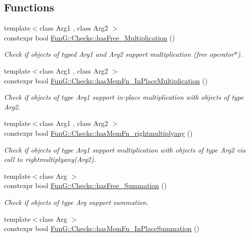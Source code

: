 \subsection*{Functions}
\begin{DoxyCompactItemize}
\item 
{\footnotesize template$<$class Arg1 , class Arg2 $>$ }\\constexpr bool \hyperlink{namespaceFunG_1_1Checks_a81302dfb773e50401ec899c3b9a53c4c}{Fun\+G\+::\+Checks\+::has\+Free\+\_\+\+Multiplication} ()
\begin{DoxyCompactList}\small\item\em Check if objects of typed Arg1 and Arg2 support multiplication (free operator$\ast$). \end{DoxyCompactList}\item 
{\footnotesize template$<$class Arg1 , class Arg2 $>$ }\\constexpr bool \hyperlink{namespaceFunG_1_1Checks_a1fb52331af88ccf29e380c8e5597e801}{Fun\+G\+::\+Checks\+::has\+Mem\+Fn\+\_\+\+In\+Place\+Multiplication} ()
\begin{DoxyCompactList}\small\item\em Check if objects of type Arg1 support in-\/place multiplication with objects of type Arg2. \end{DoxyCompactList}\item 
{\footnotesize template$<$class Arg1 , class Arg2 $>$ }\\constexpr bool \hyperlink{namespaceFunG_1_1Checks_a88d1f93f87cf5f51d426fcfee862d6f6}{Fun\+G\+::\+Checks\+::has\+Mem\+Fn\+\_\+rightmultiplyany} ()
\begin{DoxyCompactList}\small\item\em Check if objects of type Arg1 support multiplication with objects of type Arg2 via call to rightmultiplyany(\+Arg2). \end{DoxyCompactList}\item 
{\footnotesize template$<$class Arg $>$ }\\constexpr bool \hyperlink{namespaceFunG_1_1Checks_a8545906a81acf9f533c3342b0d02a6e9}{Fun\+G\+::\+Checks\+::has\+Free\+\_\+\+Summation} ()
\begin{DoxyCompactList}\small\item\em Check if objects of type Arg support summation. \end{DoxyCompactList}\item 
{\footnotesize template$<$class Arg $>$ }\\constexpr bool \hyperlink{namespaceFunG_1_1Checks_a5357edca3d0fdcfbc1fba5fd43713b40}{Fun\+G\+::\+Checks\+::has\+Mem\+Fn\+\_\+\+In\+Place\+Summation} ()

\end{DoxyCompactItemize}
